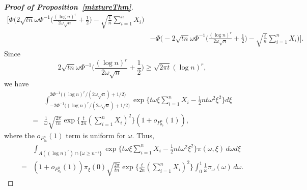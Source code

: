 \documentclass[11pt]{article}
\theoremstyle{plain}
\theoremstyle{definition}
\theoremstyle{remark}
\begin{document}
\begin{appendices}
\begin{proof}[\textbf{Proof of Proposition~\ref{mixtureThm}}]
\begin{align*}
\bigg[
    \Phi\bigg(2\sqrt{tn}\omega \Phi^{-1}\Big(\frac{(\log n)^r}{2\omega\sqrt{n}}+\frac 12\Big)-\sqrt{\frac t n} \sum_{i=1}^n X_i\bigg)
    \\
    &
    -
    \Phi\bigg(-2\sqrt{tn}\omega \Phi^{-1}\Big(\frac{(\log n)^r}{2\omega\sqrt{n}}+\frac 12\Big)-\sqrt{\frac t n} \sum_{i=1}^n X_i\bigg)
\bigg].
\end{align*}
Since
\begin{equation*}
    2\sqrt{tn}\omega \Phi^{-1}\Big(\frac{(\log n)^r}{2\omega\sqrt{n}}+\frac 12\Big)
    \geq 
    \sqrt{2\pi t} (\log n)^r,
\end{equation*}
we have
\begin{align*}
    &\int_{-2\Phi^{-1}\big((\log n)^r/(2\omega \sqrt{n})+1/2\big)}^{2\Phi^{-1}\big((\log n)^r/(2\omega \sqrt{n})+1/2\big)} \exp\big\{
        t\omega \xi \sum_{i=1}^n X_i -\frac{1}{2} nt\omega^2 \xi^2
\big\} d\xi
\\
=&
 \frac{1}{\omega}\sqrt{\frac{2\pi}{tn}}  \exp\Big\{\frac{t}{2n}(\sum_{i=1}^n X_i)^2\Big\}
(1+o_{P^n_{\theta_0}}(1)),
\end{align*}
where the $o_{P^n_{\theta_0}}(1)$ term is uniform for $\omega$.
Thus,
\begin{align*}
    &\int_{A((\log n)^r)\cap \{\omega\geq n^{-s}\} } \exp\big\{
        t\omega \xi \sum_{i=1}^n X_i -\frac{1}{2} nt\omega^2 \xi^2
    \big\} \pi(\omega,\xi)\, d\omega d\xi
    \\
=&(1+o_{P^n_{\theta_0}}(1))\pi_{\xi}(0)\sqrt{\frac{2\pi}{tn}}\exp \Big\{ \frac{t}{2n}(\sum_{i=1}^n X_i)^2\Big\} 
\int_{0}^1 
\frac{1}{\omega}
\pi_{\omega}(\omega)\, d\omega.
\end{align*}



\end{proof}
\end{appendices}
\end{document}
